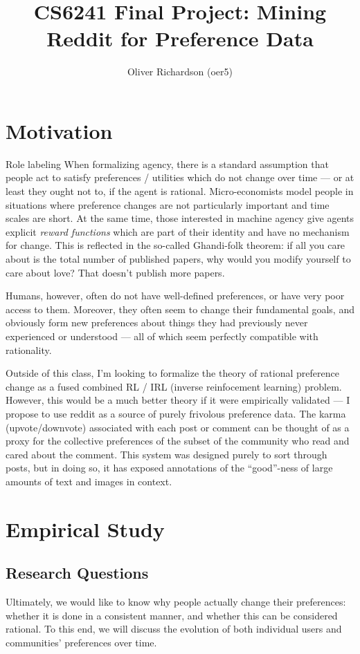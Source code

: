 \documentclass{amsart}
\author{Oliver Richardson (oer5)}
\title{CS6241 Final Project: Mining Reddit for Preference Data}
\begin{document}
	\maketitle
	
	\section{Motivation}Role labeling 
	When formalizing agency, there is a standard assumption that people act to satisfy preferences / utilities which do not change over time --- or at least they ought not to, if the agent is rational. Micro-economists model people in situations where preference changes are not particularly important and time scales are short. At the same time, those interested in machine agency give agents explicit \textit{reward functions} which are part of their identity and have no mechanism for change. This is reflected in the so-called Ghandi-folk theorem: if all you care about is the total number of published papers, why would you modify yourself to care about love? That doesn't publish more papers. 
	
	Humans, however, often do not have well-defined preferences, or have very poor access to them. Moreover, they often seem to change their fundamental goals, and obviously form new preferences about things they had previously never experienced or understood --- all of which seem perfectly compatible with rationality.
	
	Outside of this class, I'm looking to formalize the theory of rational preference change as a fused combined RL / IRL (inverse reinfocement learning) problem. However, this would be a much better theory if it were empirically validated --- I propose to use reddit as a source of purely frivolous preference data. The karma (upvote/downvote) associated with each post or comment can be thought of as a proxy for the collective preferences of the subset of the community who read and cared about the comment. This system was designed purely to sort through posts, but in doing so, it has exposed annotations of the ``good''-ness of large amounts of text and images in context.
	
	
	\section{Empirical Study}
	
	\subsection{Research Questions}
	Ultimately, we would like to know why people actually change their preferences: whether it is done in a consistent manner, and whether this can be considered rational. To this end, we will discuss the evolution of both individual users and communities' preferences over time. 
\end{document}
